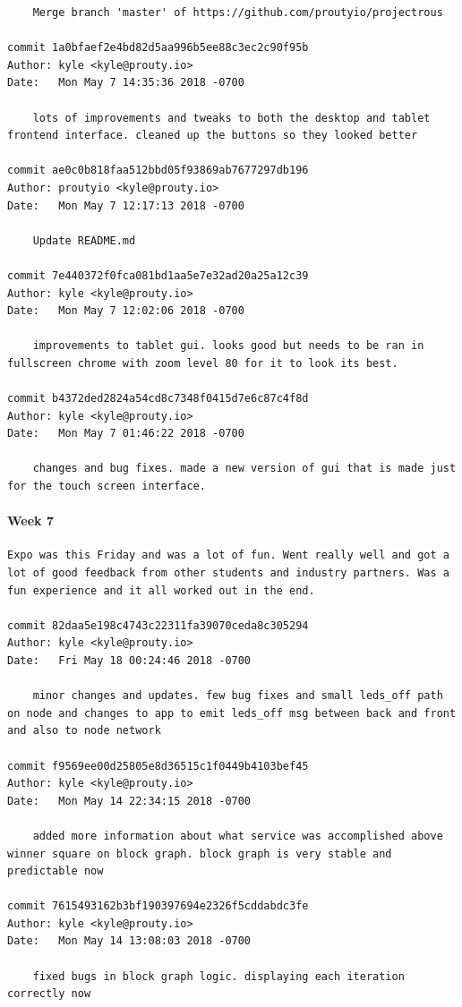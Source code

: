 \documentclass[draftclsnofoot, onecolumn, compsoc, 10pt]{IEEEtran}
\begin{document}
\begin{lstlisting}
    Merge branch 'master' of https://github.com/proutyio/projectrous 

commit 1a0bfaef2e4bd82d5aa996b5ee88c3ec2c90f95b 
Author: kyle <kyle@prouty.io> 
Date:   Mon May 7 14:35:36 2018 -0700 

    lots of improvements and tweaks to both the desktop and tablet frontend interface. cleaned up the buttons so they looked better 

commit ae0c0b818faa512bbd05f93869ab7677297db196 
Author: proutyio <kyle@prouty.io> 
Date:   Mon May 7 12:17:13 2018 -0700 

    Update README.md 

commit 7e440372f0fca081bd1aa5e7e32ad20a25a12c39 
Author: kyle <kyle@prouty.io> 
Date:   Mon May 7 12:02:06 2018 -0700 

    improvements to tablet gui. looks good but needs to be ran in fullscreen chrome with zoom level 80 for it to look its best. 

commit b4372ded2824a54cd8c7348f0415d7e6c87c4f8d 
Author: kyle <kyle@prouty.io> 
Date:   Mon May 7 01:46:22 2018 -0700 

    changes and bug fixes. made a new version of gui that is made just for the touch screen interface. 
\end{lstlisting}
\paragraph{Week 7}
\begin{lstlisting}
Expo was this Friday and was a lot of fun. Went really well and got a lot of good feedback from other students and industry partners. Was a fun experience and it all worked out in the end. 

commit 82daa5e198c4743c22311fa39070ceda8c305294 
Author: kyle <kyle@prouty.io> 
Date:   Fri May 18 00:24:46 2018 -0700 

    minor changes and updates. few bug fixes and small leds_off path on node and changes to app to emit leds_off msg between back and front and also to node network 

commit f9569ee00d25805e8d36515c1f0449b4103bef45 
Author: kyle <kyle@prouty.io> 
Date:   Mon May 14 22:34:15 2018 -0700 

    added more information about what service was accomplished above winner square on block graph. block graph is very stable and predictable now 

commit 7615493162b3bf190397694e2326f5cddabdc3fe 
Author: kyle <kyle@prouty.io> 
Date:   Mon May 14 13:08:03 2018 -0700 

    fixed bugs in block graph logic. displaying each iteration correctly now 
\end{lstlisting}
\end{document}
